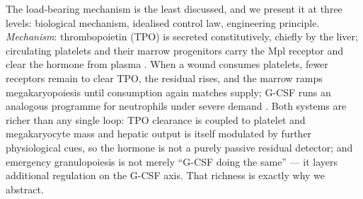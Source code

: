 \documentclass[twoside,twocolumn,usenatbib]{mnras}
\begin{document}
The load-bearing mechanism is the least discussed, and we present it at
three levels: biological mechanism, idealised control law, engineering
principle. \emph{Mechanism}: thrombopoietin (TPO) is secreted
constitutively, chiefly by the liver; circulating platelets and their
marrow progenitors carry the Mpl receptor and clear the hormone from
plasma \citep{kaushansky2005}. When a wound consumes platelets, fewer
receptors remain to clear TPO, the residual rises, and the marrow ramps
megakaryopoiesis until consumption again matches supply; G-CSF runs an
analogous programme for neutrophils under severe demand
\citep{manz2014}. Both systems are richer than any single loop: TPO
clearance is coupled to platelet and megakaryocyte mass and hepatic
output is itself modulated by further physiological cues, so the hormone
is not a purely passive residual detector; and emergency granulopoiesis
is not merely ``G-CSF doing the same'' --- it layers additional
regulation on the G-CSF axis. That richness is exactly why we abstract.
\end{document}
